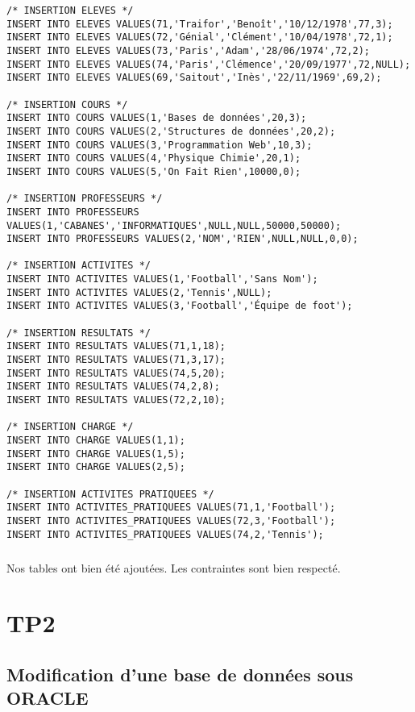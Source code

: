 \documentclass{report}
\begin{document}
\begin{lstlisting}
/* INSERTION ELEVES */
INSERT INTO ELEVES VALUES(71,'Traifor','Benoît','10/12/1978',77,3);
INSERT INTO ELEVES VALUES(72,'Génial','Clément','10/04/1978',72,1);
INSERT INTO ELEVES VALUES(73,'Paris','Adam','28/06/1974',72,2);
INSERT INTO ELEVES VALUES(74,'Paris','Clémence','20/09/1977',72,NULL);
INSERT INTO ELEVES VALUES(69,'Saitout','Inès','22/11/1969',69,2);

/* INSERTION COURS */
INSERT INTO COURS VALUES(1,'Bases de données',20,3);
INSERT INTO COURS VALUES(2,'Structures de données',20,2);
INSERT INTO COURS VALUES(3,'Programmation Web',10,3);
INSERT INTO COURS VALUES(4,'Physique Chimie',20,1);
INSERT INTO COURS VALUES(5,'On Fait Rien',10000,0);

/* INSERTION PROFESSEURS */
INSERT INTO PROFESSEURS VALUES(1,'CABANES','INFORMATIQUES',NULL,NULL,50000,50000);
INSERT INTO PROFESSEURS VALUES(2,'NOM','RIEN',NULL,NULL,0,0);

/* INSERTION ACTIVITES */
INSERT INTO ACTIVITES VALUES(1,'Football','Sans Nom');
INSERT INTO ACTIVITES VALUES(2,'Tennis',NULL);
INSERT INTO ACTIVITES VALUES(3,'Football','Équipe de foot');

/* INSERTION RESULTATS */
INSERT INTO RESULTATS VALUES(71,1,18);
INSERT INTO RESULTATS VALUES(71,3,17);
INSERT INTO RESULTATS VALUES(74,5,20);
INSERT INTO RESULTATS VALUES(74,2,8);
INSERT INTO RESULTATS VALUES(72,2,10);

/* INSERTION CHARGE */
INSERT INTO CHARGE VALUES(1,1);
INSERT INTO CHARGE VALUES(1,5);
INSERT INTO CHARGE VALUES(2,5);

/* INSERTION ACTIVITES PRATIQUEES */
INSERT INTO ACTIVITES_PRATIQUEES VALUES(71,1,'Football');
INSERT INTO ACTIVITES_PRATIQUEES VALUES(72,3,'Football');
INSERT INTO ACTIVITES_PRATIQUEES VALUES(74,2,'Tennis');
\end{lstlisting}

\paragraph{}Nos tables ont bien été ajoutées. Les contraintes sont bien respecté.


\chapter{TP2}

\section{Modification d'une base de données sous ORACLE}
\end{document}
